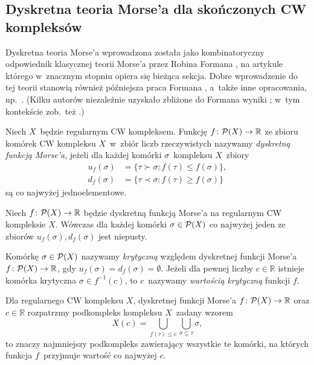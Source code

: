 \subsection{Dyskretna teoria Morse'a dla skończonych CW kompleksów}\label{subsec-forman_classical_discrete_morse}
Dyskretna teoria Morse'a wprowadzona została jako kombinatoryczny odpowiednik klasycznej teorii Morse'a przez Robina Formana \cite{Forman98}, na artykule którego w~znacznym stopniu opiera się bieżąca sekcja. Dobre wprowadzenie do tej teorii stanowią również późniejsza praca Formana \cite{Forman02}, a~także inne opracowania, np.~\cite{Blanchet05,Kozlov08,Orlik07}. (Kilku autorów niezależnie uzyskało zbliżone do Formana wyniki \cite{Brown92,Jones88,Bestvina08,Bestvina97}; w~tym kontekście zob.~też \cite{Banchoff67,Bloch13,Lewiner13}.)

Niech $X$~będzie regularnym CW kompleksem. Funkcję $f\colon \mathcal{P}(X)\to \mathbb{R}$ ze zbioru komórek CW kompleksu $X$~w~zbiór liczb rzeczywistych nazywamy \textit{dyskretną funkcją Morse'a}, jeżeli dla każdej komórki $\sigma$~kompleksu $X$~zbiory \begin{align*}u_f(\sigma)&=\{\tau\succ \sigma:f(\tau)\leq f(\sigma)\},\\ d_f(\sigma)&=\{\tau\prec \sigma:f(\tau)\geq f(\sigma)\}\end{align*} są co najwyżej jednoelementowe. 
\begin{lem}\label{lem-lemat_formana_ze_tylko_jeden_niepusty}
Niech $f\colon \mathcal{P}(X)\to \mathbb{R}$ będzie dyskretną funkcją Morse'a na regularnym CW kompleksie $X$. Wówczas dla każdej komórki $\sigma\in \mathcal{P}(X)$ co najwyżej jeden ze zbiorów $u_f(\sigma),d_f(\sigma)$ jest niepusty.
\end{lem}
Komórkę $\sigma\in \mathcal{P}(X)$ nazywamy \textit{krytyczną} względem dyskretnej funkcji Morse'a $f\colon \mathcal{P}(X)\to \mathbb{R}$, gdy $u_f(\sigma)=d_f(\sigma)=\emptyset$. Jeżeli dla pewnej liczby $c\in\mathbb{R}$ istnieje komórka krytyczna $\sigma\in f^{-1}(c)$, to $c$~nazywamy \textit{wartością krytyczną} funkcji $f$.

Dla regularnego CW kompleksu $X$, dyskretnej funkcji Morse'a $f\colon \mathcal{P}(X)\to \mathbb{R}$ oraz $c\in\mathbb{R}$ rozpatrzmy podkompleks kompleksu $X$~zadany wzorem \[X(c)=\bigcup_{f(\tau)\leq c}\bigcup_{\sigma\subseteq \tau}\sigma,\] to znaczy najmniejszy podkompleks zawierający wszystkie te komórki, na których funkcja $f$~przyjmuje wartość co najwyżej $c$.


